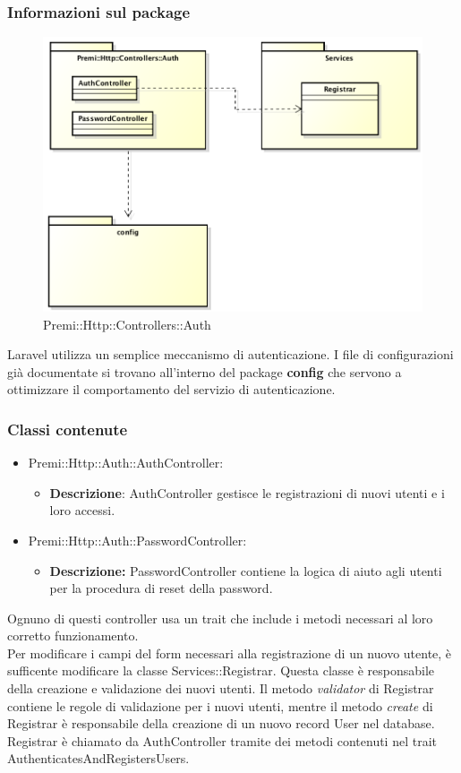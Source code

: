 		\subsubsection*{Informazioni sul package}
		\begin{figure}[h]
			\centering
			\includegraphics[width=0.9\linewidth]{img/premi_http_controllers_auth}
			\caption[Premi::Http::Controllers::Auth]{Premi::Http::Controllers::Auth}
			\label{fig:premi_http_controllers_auth}
		\end{figure}
	Laravel utilizza un semplice meccanismo di autenticazione. I file di configurazioni già documentate si trovano all'interno del package \textbf{config} che servono a ottimizzare il comportamento del servizio di autenticazione.		
	\subsubsection*{Classi contenute}
		\begin{itemize}
			\item Premi::Http::Auth::AuthController:
				\begin{itemize}
					\item \textbf{Descrizione}: AuthController gestisce le registrazioni di nuovi utenti e i loro accessi.
				\end{itemize}
			\item Premi::Http::Auth::PasswordController:
				\begin{itemize}
					\item \textbf{Descrizione:} PasswordController contiene la logica di aiuto agli utenti per la procedura di reset della password.
				\end{itemize}
		\end{itemize}
	Ognuno di questi controller usa un \gls{trait} che include i metodi necessari al loro corretto funzionamento.\\
	Per modificare i campi del form necessari alla registrazione di un nuovo utente, è sufficente modificare la classe Services::Registrar. Questa classe è responsabile della creazione e validazione dei nuovi utenti. Il metodo \textit{validator} di Registrar contiene le regole di validazione per i nuovi utenti, mentre il metodo \textit{create} di Registrar è responsabile della creazione di un nuovo record User nel database. Registrar è chiamato da AuthController tramite dei metodi contenuti nel \gls{trait} AuthenticatesAndRegistersUsers.
	
